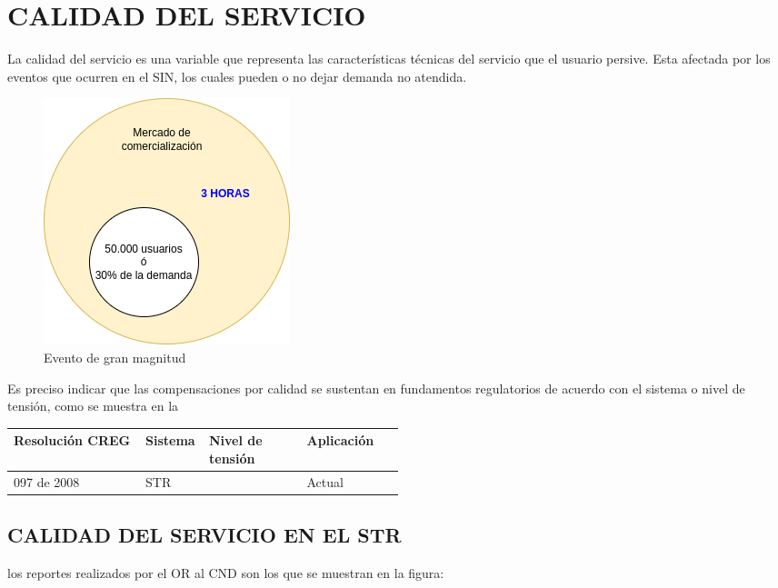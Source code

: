 \documentclass[a5paper]{book}%
\begin{document}
\chapter{CALIDAD DEL SERVICIO}

La calidad del servicio  es una variable que representa las características técnicas del servicio que el usuario persive. Esta afectada por los eventos que ocurren en
el \ac{SIN}, los cuales pueden o no dejar demanda no atendida.

\begin{figure}[H]
  \centering
  \caption{Evento de gran magnitud}
  \label{fig:eventogranmagnitud}
  \includegraphics[width=0.6\linewidth]{evento_gran_magnitud}
\end{figure}

Es preciso indicar que las compensaciones por calidad se sustentan en fundamentos regulatorios
de acuerdo con el sistema o nivel de tensión, como se muestra en la

\begin{tabular}{llp{0.25\linewidth}p{0.25\linewidth}}
  \hline
Resolución CREG& Sistema & Nivel de tensión & Aplicación \\\hline
  097 de 2008 & STR & & Actual  \\\hline
  \end{tabular}

\section{CALIDAD DEL SERVICIO EN EL STR}





los reportes realizados por el \ac{OR} al \ac{CND} son los que se muestran en la figura:
\end{document}
